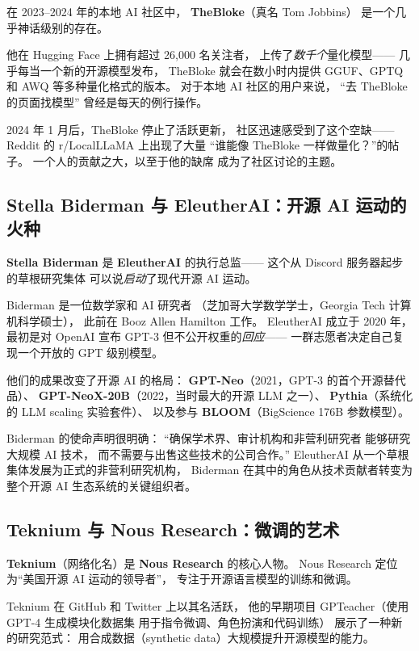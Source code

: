 在 2023--2024 年的本地 AI 社区中，
\textbf{TheBloke}（真名 Tom Jobbins）
是一个几乎神话级别的存在。

他在 Hugging Face 上拥有超过 26,000 名关注者，
上传了\emph{数千个}量化模型——
几乎每当一个新的开源模型发布，
TheBloke 就会在数小时内提供
GGUF、GPTQ 和 AWQ 等多种量化格式的版本。
对于本地 AI 社区的用户来说，
``去 TheBloke 的页面找模型''
曾经是每天的例行操作。

2024 年 1 月后，TheBloke 停止了活跃更新，
社区迅速感受到了这个空缺——
Reddit 的 r/LocalLLaMA 上出现了大量
``谁能像 TheBloke 一样做量化？''的帖子。
一个人的贡献之大，以至于他的缺席
成为了社区讨论的主题。

\subsection{Stella Biderman 与 EleutherAI：开源 AI 运动的火种}

\textbf{Stella Biderman} 是 \textbf{EleutherAI} 的执行总监——
这个从 Discord 服务器起步的草根研究集体
可以说\emph{启动}了现代开源 AI 运动。

Biderman 是一位数学家和 AI 研究者
（芝加哥大学数学学士，Georgia Tech 计算机科学硕士），
此前在 Booz Allen Hamilton 工作。
EleutherAI 成立于 2020 年，
最初是对 OpenAI 宣布 GPT-3 但不公开权重的\emph{回应}——
一群志愿者决定自己复现一个开放的 GPT 级别模型。

他们的成果改变了开源 AI 的格局：
\textbf{GPT-Neo}（2021，GPT-3 的首个开源替代品）、
\textbf{GPT-NeoX-20B}（2022，当时最大的开源 LLM 之一）、
\textbf{Pythia}（系统化的 LLM scaling 实验套件）、
以及参与 \textbf{BLOOM}（BigScience 176B 参数模型）。

Biderman 的使命声明很明确：
``确保学术界、审计机构和非营利研究者
能够研究大规模 AI 技术，
而不需要与出售这些技术的公司合作。''
EleutherAI 从一个草根集体发展为正式的非营利研究机构，
Biderman 在其中的角色从技术贡献者转变为
整个开源 AI 生态系统的关键组织者。

\subsection{Teknium 与 Nous Research：微调的艺术}

\textbf{Teknium}（网络化名）是 \textbf{Nous Research} 的核心人物。
Nous Research 定位为``美国开源 AI 运动的领导者''，
专注于开源语言模型的训练和微调。

Teknium 在 GitHub 和 Twitter 上以其名活跃，
他的早期项目 GPTeacher（使用 GPT-4 生成模块化数据集
用于指令微调、角色扮演和代码训练）
展示了一种新的研究范式：
用合成数据（synthetic data）大规模提升开源模型的能力。

